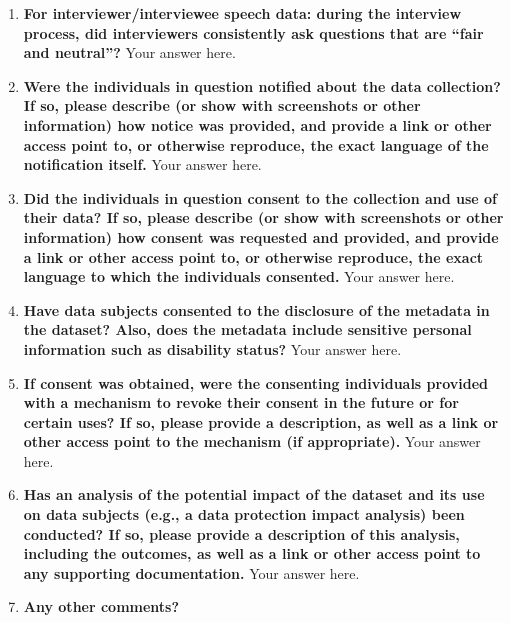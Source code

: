 \documentclass{article}
\begin{document}
\begin{enumerate}[leftmargin=0.65cm]
        \item \textbf{For interviewer/interviewee speech data: during the interview process, did interviewers consistently ask questions that are ``fair and neutral''?}
        \newline 
        Your answer here.
        \newline 
        
        \item \textbf{Were the individuals in question notified about the data collection? If so, please describe (or show with screenshots or other information) how notice was provided, and provide a link or other access point to, or otherwise reproduce, the exact language of the notification itself.}
        \newline 
        Your answer here.
        \newline 
        
        \item \textbf{Did the individuals in question consent to the collection and use of their data? If so, please describe (or show with screenshots or other information) how consent was requested and provided, and provide a link or other access point to, or otherwise reproduce, the exact language to which the individuals consented.}
        \newline 
        Your answer here.
        \newline 
        
        \item \textbf{Have data subjects consented to the disclosure of the metadata in the dataset? Also, does the metadata include sensitive personal information such as disability status?}
        \newline 
        Your answer here.
        \newline 
        
        \item \textbf{If consent was obtained, were the consenting individuals provided with a mechanism to revoke their consent in the future or for certain uses? If so, please provide a description, as well as a link or other access point to the mechanism (if appropriate).}
        \newline 
        Your answer here.
        \newline 
        
        \item \textbf{Has an analysis of the potential impact of the dataset and its use on data subjects (e.g., a data protection impact analysis) been conducted? If so, please provide a description of this analysis, including the outcomes, as well as a link or other access point to any supporting documentation.}
        \newline 
        Your answer here.
        \newline 
        
        \item \textbf{Any other comments?}
    \end{enumerate}
\end{document}
